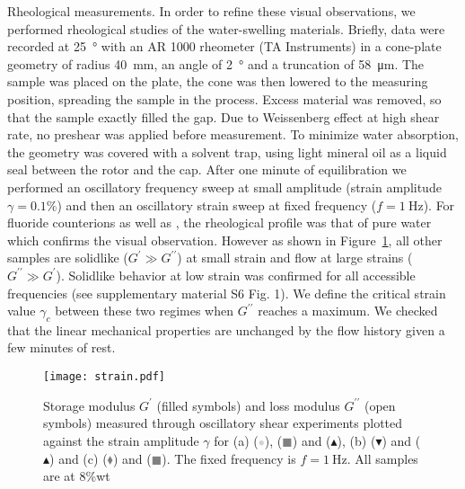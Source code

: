 \documentclass[journal=jacsat,manuscript=article]{achemso}
\begin{document}
Rheological measurements. In order to refine these visual observations, we performed rheological studies of the water-swelling materials. Briefly, data were recorded at \SI{25}{\degree} with an AR 1000 rheometer (TA Instruments) in a cone-plate geometry of radius \SI{40}{\milli\metre}, an angle of \SI{2}{\degree} and a truncation of \SI{58}{\micro\metre}.\cite{Macosko1994,Larson1999} The sample was placed on the plate, the cone was then lowered to the measuring position, spreading the sample in the process. Excess material was removed, so that the sample exactly filled the gap. Due to Weissenberg effect at high shear rate, no preshear was applied before measurement. To minimize water absorption, the geometry was covered with a solvent trap, using light mineral oil as a liquid seal between the rotor and the cap. After one minute of equilibration we performed an oscillatory frequency sweep at small amplitude (strain amplitude $\gamma=0.1\%$) and then an oscillatory strain sweep at fixed frequency ($f=\SI{1}{\hertz}$). For fluoride counterions as well as , the rheological profile was that of pure water which confirms the visual observation. However as shown in Figure~\ref{fig:strain}, all other samples are solidlike ($G^\prime \gg G^{\prime\prime}$) at small strain and flow at large strains ($G^{\prime\prime} \gg G^\prime$). Solidlike behavior at low strain was confirmed for all accessible frequencies (see supplementary material S6 Fig. 1). We define the critical strain value $\gamma_c$ between these two regimes when $G^{\prime\prime}$ reaches a maximum. We checked that the linear mechanical properties are unchanged by the flow history given a few minutes of rest. %

\begin{figure}
\texttt{[image: strain.pdf]}
\caption{Storage modulus $G^\prime$ (filled symbols) and loss modulus $G^{\prime\prime}$ (open symbols) measured through oscillatory shear experiments plotted against the strain amplitude $\gamma$ for (a)  (\textcolor{lightgray}{$\bullet$}),  (\textcolor{gray}{$\blacksquare$}) and  ($\blacktriangle$), (b)  ($\blacktriangledown$) and  ($\blacktriangle$) and (c)  (\textcolor{gray}{$\blacklozenge$}) and  (\textcolor{gray}{$\blacksquare$}). The fixed frequency is $f=\SI{1}{\hertz}$. All samples are at 8\%wt }
\label{fig:strain}
\end{figure}
\end{document}
